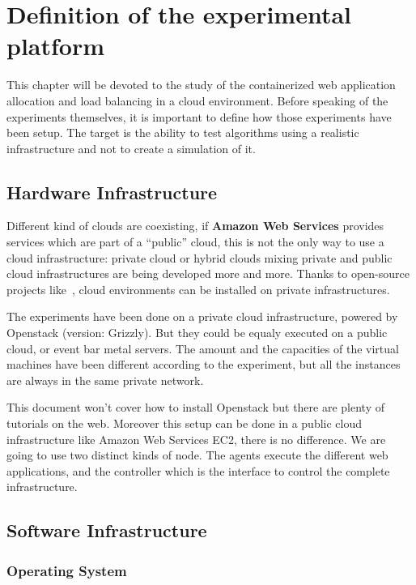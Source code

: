\chapter{Definition of the experimental platform}
\label{chap:expsetup}

This chapter will be devoted to the study of the containerized web application
allocation and load balancing in a cloud environment. Before speaking of the
experiments themselves, it is important to define how those experiments have
been setup. The target is the ability to test algorithms using a realistic
infrastructure and not to create a simulation of it.

\section{Hardware Infrastructure}

Different kind of clouds are coexisting, if \textbf{Amazon Web Services} provides
services which are part of a “public” cloud, this is not the only way to use a
cloud infrastructure: private cloud or hybrid clouds mixing private and public
cloud infrastructures are being developed more and more. Thanks to open-source
projects like~\cite{websiteOpenstack}, cloud environments can be installed on
private infrastructures.

The experiments have been done on a private cloud infrastructure, powered by
Openstack (version: Grizzly). But they could be equaly executed on a public
cloud, or event bar metal servers. The amount and the capacities of the virtual
machines have been different according to the experiment, but all the instances
are always in the same private network.

This document won't cover how to install Openstack but there are plenty of
tutorials on the web. Moreover this setup can be done in a public cloud
infrastructure like Amazon Web Services EC2, there is no difference. We are
going to use two distinct kinds of node. The agents execute the
different web applications, and the controller which is the interface to
control the complete infrastructure.

\section{Software Infrastructure}
\subsection{Operating System}

